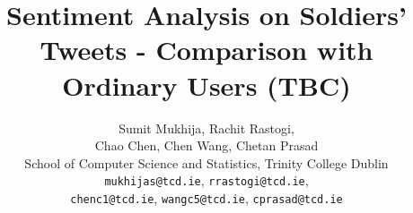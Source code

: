 \documentclass[american,a4paper,11pt]{article}
\title{Sentiment Analysis on Soldiers' Tweets - Comparison with Ordinary Users (TBC)}
\date{}
\author{
  Sumit Mukhija, Rachit Rastogi,\\
  Chao Chen, Chen Wang, Chetan Prasad\\
  School of Computer Science and Statistics, Trinity College Dublin\\
  \texttt{mukhijas@tcd.ie}, \texttt{rrastogi@tcd.ie},\\
  \texttt{chenc1@tcd.ie}, \texttt{wangc5@tcd.ie}, \texttt{cprasad@tcd.ie}
}
\begin{document}
\maketitle
\thispagestyle{empty}
\pagestyle{empty}

\begin{abstract}

\end{abstract}








\printbibliography
\end{document}
